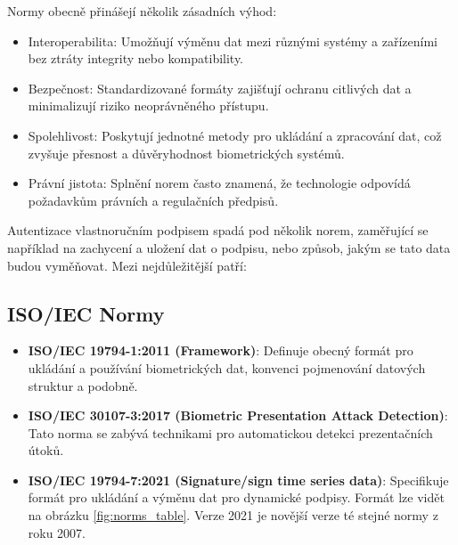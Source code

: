Normy obecně přinášejí několik zásadních výhod:
\begin{itemize}
  \item Interoperabilita: Umožňují výměnu dat mezi různými systémy a zařízeními bez ztráty integrity nebo kompatibility.
  \item Bezpečnost: Standardizované formáty zajišťují ochranu citlivých dat a minimalizují riziko neoprávněného přístupu.
  \item Spolehlivost: Poskytují jednotné metody pro ukládání a zpracování dat, což zvyšuje přesnost a důvěryhodnost biometrických systémů.
  \item Právní jistota: Splnění norem často znamená, že technologie odpovídá požadavkům právních a regulačních předpisů.
\end{itemize}

Autentizace vlastnoručním podpisem spadá pod několik norem, zaměřující se například na zachycení a uložení dat o podpisu, nebo způsob, jakým se tato data budou vyměňovat. 
Mezi nejdůležitější patří:

\subsection*{ISO/IEC Normy}
\begin{itemize}
  \item \textbf{ISO/IEC 19794-1:2011 (Framework)}: 
  Definuje obecný formát pro ukládání a používání biometrických dat, konvenci pojmenování datových struktur a podobně. %

  \item \textbf{ISO/IEC 30107-3:2017 (Biometric Presentation Attack Detection)}: 
  Tato norma se zabývá technikami pro automatickou detekci prezentačních útoků. %

  \item \textbf{ISO/IEC 19794-7:2021 (Signature/sign time series data)}:
  Specifikuje formát pro ukládání a výměnu dat pro dynamické podpisy. 
  Formát lze vidět na obrázku \ref{fig:norms_table}. 
  Verze 2021 je novější verze té stejné normy z roku 2007. %
\end{itemize}

